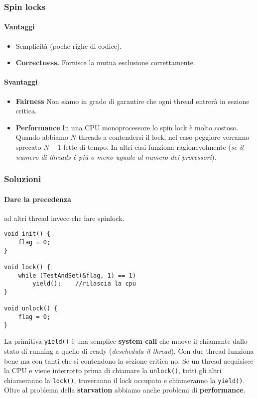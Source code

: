 \documentclass[12pt, twoside, letterpaper]{article}
\begin{document}
			\subsubsection{Spin locks}
				\paragraph{Vantaggi} 
				\begin{itemize}
					\item Semplicità (poche righe di codice).
					\item \textbf{Correctness.} Fornisce la mutua esclusione correttamente.
				\end{itemize}								
				
				\paragraph{Svantaggi} 
					\begin{itemize}
						\item \textbf{Fairness} Non siamo in grado di garantire che ogni thread entrerà in sezione critica.
						\item \textbf{Performance} In una CPU monoprocessore lo spin lock è molto costoso. Quando abbiamo $N$ threads a contendersi il lock, nel caso peggiore verranno sprecato $N-1$ fette di tempo. In altri casi funziona ragionevolmente (\textit{se il numero di threads è più o meno uguale al numero dei processori}).
					\end{itemize}
					
			\subsubsection{Soluzioni}
				\paragraph{Dare la precedenza} ad altri thread invece che fare spinlock.
				\begin{lstlisting}[style=CStyle]
void init() {
	flag = 0;
}

void lock() {
	while (TestAndSet(&flag, 1) == 1)
		yield(); 	//rilascia la cpu
}

void unlock() {
	flag = 0;
}				\end{lstlisting}
				La primitiva \texttt{yield()} è una semplice \textbf{system call} che muove il chiamante dallo stato di running a quello di ready (\textit{deschedula il thread}). Con due thread funziona bene ma con tanti che si contendono la sezione critica no. Se un thread acquisisce la CPU e viene interrotto prima di chiamare la \texttt{unlock()}, tutti gli altri chiameranno la \texttt{lock()}, troveranno il lock occupato e chiameranno la \texttt{yield()}. Oltre al problema della \textbf{starvation }abbiamo anche problemi di \textbf{performance}.
				
\end{document}
